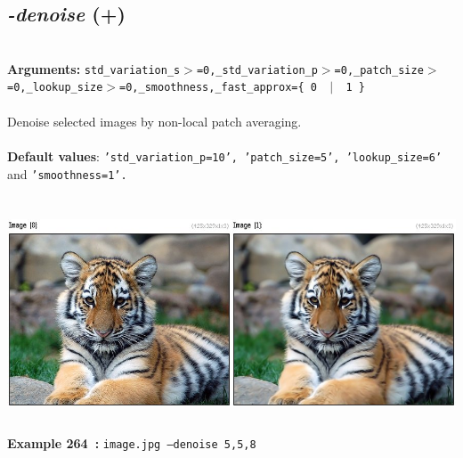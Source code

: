 \documentclass[a4paper,11pt,twoside]{book}
\begin{document}
\subsection{\emph{-denoise} (+)}\vspace*{-0.5em}
~\\\textbf{Arguments: } 
{\small \texttt{std\_variation\_s$>$=0,\_std\_variation\_p$>$=0,\_patch\_size$>$=0,\_lookup\_size$>$=0,\_smoothness,\_fast\_approx=\{ 0 ~$|$~ 1 \}}}\\~\\
Denoise selected images by non-local patch averaging.
~\\~\\\textbf{Default values}: {\small \texttt{'std\_variation\_p=10', 'patch\_size=5', 'lookup\_size=6'} and \texttt{'smoothness=1'.}}
\begin{center}\includegraphics[keepaspectratio=true,height=7cm,width=\textwidth]{img/gmic_def264.jpg}\\
{\footnotesize \textbf{Example 264~:} \texttt{image.jpg --denoise 5,5,8}}
\end{center}
\end{document}
